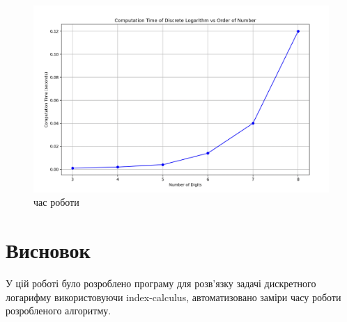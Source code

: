 \documentclass{article}
\begin{document}
\begin{figure}[htbp]
    \centering
    \includegraphics[width=1.0\textwidth]{graphic.png}
    \caption{час роботи}
    \label{fig:screenshot}
\end{figure}

\section{Висновок}
\quad
У цій роботі було розроблено програму для розв'язку задачі дискретного логарифму використовуючи index-calculus, автоматизовано заміри часу роботи розробленого алгоритму.
\end{document}
